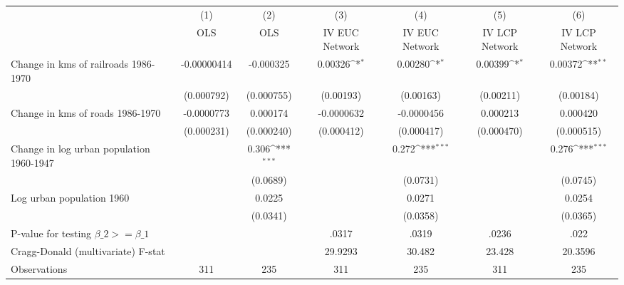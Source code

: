{
\def\sym#1{\ifmmode^{#1}\else\(^{#1}\)\fi}
\begin{tabular}{l*{6}{c}}
\hline\hline
                &\multicolumn{1}{c}{(1)}&\multicolumn{1}{c}{(2)}&\multicolumn{1}{c}{(3)}&\multicolumn{1}{c}{(4)}&\multicolumn{1}{c}{(5)}&\multicolumn{1}{c}{(6)}\\
                &\multicolumn{1}{c}{OLS}&\multicolumn{1}{c}{OLS}&\multicolumn{1}{c}{IV EUC Network}&\multicolumn{1}{c}{IV EUC Network}&\multicolumn{1}{c}{IV LCP Network}&\multicolumn{1}{c}{IV LCP Network}\\
\hline
Change in kms of railroads 1986-1970&-0.00000414         &-0.000325         &  0.00326\sym{*}  &  0.00280\sym{*}  &  0.00399\sym{*}  &  0.00372\sym{**} \\
                &(0.000792)         &(0.000755)         &(0.00193)         &(0.00163)         &(0.00211)         &(0.00184)         \\
[1em]
Change in kms of roads 1986-1970&-0.0000773         & 0.000174         &-0.0000632         &-0.0000456         & 0.000213         & 0.000420         \\
                &(0.000231)         &(0.000240)         &(0.000412)         &(0.000417)         &(0.000470)         &(0.000515)         \\
[1em]
Change in log urban population 1960-1947&                  &    0.306\sym{***}&                  &    0.272\sym{***}&                  &    0.276\sym{***}\\
                &                  & (0.0689)         &                  & (0.0731)         &                  & (0.0745)         \\
[1em]
Log urban population 1960&                  &   0.0225         &                  &   0.0271         &                  &   0.0254         \\
                &                  & (0.0341)         &                  & (0.0358)         &                  & (0.0365)         \\
\hline
P-value for testing $\beta\_{2} >= \beta\_{1}$&                  &                  &    .0317         &    .0319         &    .0236         &     .022         \\
Cragg-Donald (multivariate) F-stat&                  &                  &  29.9293         &   30.482         &   23.428         &  20.3596         \\
Observations    &      311         &      235         &      311         &      235         &      311         &      235         \\
\hline\hline
\end{tabular}
}
